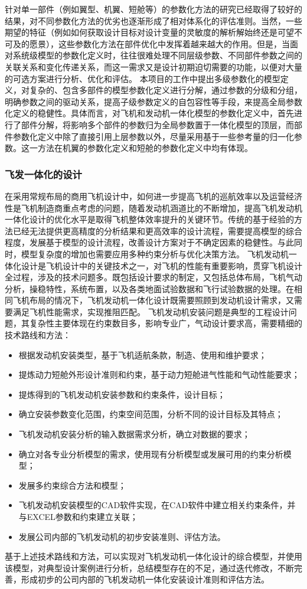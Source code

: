 \documentclass[12pt,a4paper]{report}
\begin{document}
针对单一部件（例如翼型、机翼、短舱等）的参数化方法的研究已经取得了较好的结果，对不同参数化方法的优劣也逐渐形成了相对体系化的评估准则。当然，一些期望的特征（例如如何获取设计目标对设计变量的灵敏度的解析解始终还是可望不可及的愿景），这些参数化方法在部件优化中发挥着越来越大的作用。但是，当面对系统级模型的参数化定义时，往往很难处理不同层级参数、不同部件参数之间的关联关系和变化传递关系，而这一需求又是设计初期迫切需要的功能，以便对大量的可选方案进行分析、优化和评估。
本项目的工作中提出多级参数化的模型定义，对复杂的、包含多部件的模型参数化定义进行分解，通过参数的分级和分组，明确参数之间的驱动关系，提高子级参数定义的自包容性等手段，来提高全局参数化定义的稳健性。具体而言，对飞机和发动机一体化模型的参数化定义中，首先进行了部件分解，将影响多个部件的参数归为全局参数置于一体化模型的顶层，而部件参数化定义中除了直接引用上层参数以外，尽量采用基于一些参考量的归一化参数。这一方法在机翼的参数化定义和短舱的参数化定义中均有体现。

\subsubsection{飞发一体化的设计}
在采用常规布局的商用飞机设计中，如何进一步提高飞机的巡航效率以及运营经济性是飞机制造商重点考虑的问题，随着发动机涵道比的不断增加，提高飞机发动机一体化设计的优化水平是取得飞机整体效率提升的关键环节。传统的基于经验的方法已经无法提供更高精度的分析结果和更高效率的设计流程，需要提高模型的综合程度，发展基于模型的设计流程，改善设计方案对于不确定因素的稳健性。与此同时，模型复杂度的增加也需要应用多种约束分析与优化决策方法。
飞机发动机一体化设计是飞机设计中的关键技术之一，对飞机的性能有重要影响，贯穿飞机设计全过程，涉及的技术问题多。既包括设计要求的制定，又包括总体布局，飞机气动分析，操稳特性，系统布置，以及各类地面试验数据和飞行试验数据的处理。在相同飞机布局的情况下，飞机发动机一体化设计既需要照顾到发动机设计需求，又需要满足飞机性能需求，实现推阻匹配。
飞机发动机安装问题是典型的工程设计问题，其复杂性主要体现在约束数目多，影响专业广，气动设计要求高，需要精细的技术路线和方法：
\begin{itemize}
\item 根据发动机安装类型，基于飞机适航条款，制造、使用和维护要求；
\item 提炼动力短舱外形设计准则和约束，基于动力短舱进气性能和气动性能要求；
\item 提炼得到的飞机发动机安装参数和约束条件，设计目标；
\item 确立安装参数变化范围，约束空间范围，分析不同的设计目标及其特点；
\item 飞机发动机安装分析的输入数据需求分析，确立对数据的要求；
\item 确立对各专业分析模型的需求，使用现有分析模型或发展可用的约束分析模型；
\item 发展多约束综合方法和模型；
\item 飞机发动机安装模型的CAD软件实现，在CAD软件中建立相关约束条件，并与EXCEL参数和约束建立关联；
\item 发展公司内部的飞机发动机的初步安装准则、评估方法。
\end{itemize}
基于上述技术路线和方法，可以实现对飞机发动机一体化设计的综合模型，并使用该模型，对典型设计案例进行分析，总结模型存在的不足，通过迭代修改，不断完善，形成初步的公司内部的飞机发动机一体化安装设计准则和评估方法。
\end{document}
